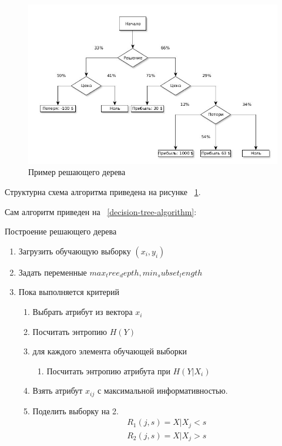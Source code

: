 \begin{figure}
  \centering
  \includegraphics[width=1.0\textwidth]{images/decision_tree_new.jpg}
  \caption{Пример решающего дерева\label{decision_tree_schema}}
\end{figure}

Структурна схема алгоритма приведена на рисунке ~\ref{decision_tree_schema}.

Сам алгоритм приведен на ~\ref{decision-tree-algorithm}:

\begin{algorithm}
  \caption{Построение решающего дерева}
  \label{decision-tree-algorithm}
  \begin{enumerate}
  \item Загрузить обучающую выборку $(x_i,y_i)$
  \item Задать переменные $max_tree_depth,min_subset_length$
  \item Пока выполняется критерий
  	\begin{enumerate}
  		\item Выбрать атрибут из вектора $x_i$
  		\item Посчитать энтропию $H(Y)$
  		\item для каждого элемента обучающей выборки
  		\begin{enumerate}
  			\item Посчитать энтропию атрибута при $H(Y|X_i)$
  		\end{enumerate}
  		\item Взять атрибут $x_{ij}$ с максимальной информативностью.
  		\item Поделить выборку на 2.
  			\begin{subequations}
  			\begin{align}
  				R_1(j,s)={X|X_j < s} \\
  				R_2(j,s)={X|X_j > s}
  			\end{align}
  			\end{subequations}
  	\end{enumerate}
  \end{enumerate}
\end{algorithm}


